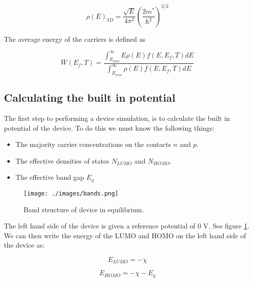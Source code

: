\begin{equation}
\rho(E)_{3D}=\frac{\sqrt{E}}{4\pi^2} \left ( \frac{2m^{*}}{\hbar^2}\right )^{3/2}
\end{equation}

The average energy of the carriers is defined as

\begin{equation}
\bar{W}(E_{f},T)=\frac{\int^{\infty}_{E_{min}} E \rho(E) f(E,E_{f},T) dE}{\int^{\infty}_{E_{min}} \rho(E) f(E,E_{f},T) dE}
\end{equation}










\subsection{Calculating the built in potential}  \label{sssec:initial}
The first step to performing a device simulation, is to calculate the built in potential of the device.  To do this we must know the following things:

\begin{itemize}

  \item The majority carrier concentrations on the contacts $n$ and $p$.
  \item The effective densities of states $N_{LUMO}$ and $N_{HOMO}$.
  \item The effective band gap $E_g$

\end{itemize}

\begin{figure}[ht!]
\centering
\texttt{[image: ./images/bands.png]}
\caption{Band structure of device in equilibrium.}
\label{fig:bands}
\end{figure}

\vspace{1em}
The left hand side of the device is given a reference potential of 0 V.  See figure \ref{fig:bands}.  We can then write the energy of the LUMO and HOMO on the left hand side of the device as:

\begin{equation}
E_{LUMO}=-\chi
\end{equation}

\begin{equation}
E_{HOMO}=-\chi-E_{g}
\end{equation}

